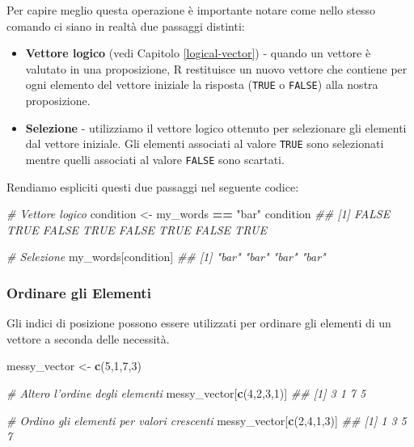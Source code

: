 \documentclass[
]{book}
\newenvironment{Shaded}{\begin{snugshade}}{\end{snugshade}}
\newcommand{\CommentTok}[1]{\textcolor[rgb]{0.56,0.35,0.01}{\textit{#1}}}
\newcommand{\DecValTok}[1]{\textcolor[rgb]{0.00,0.00,0.81}{#1}}
\newcommand{\KeywordTok}[1]{\textcolor[rgb]{0.13,0.29,0.53}{\textbf{#1}}}
\newcommand{\NormalTok}[1]{#1}
\newcommand{\OperatorTok}[1]{\textcolor[rgb]{0.81,0.36,0.00}{\textbf{#1}}}
\newcommand{\StringTok}[1]{\textcolor[rgb]{0.31,0.60,0.02}{#1}}
\providecommand{\tightlist}{%
  \setlength{\itemsep}{0pt}\setlength{\parskip}{0pt}}
\begin{document}
Per capire meglio questa operazione è importante notare come nello stesso comando ci siano in realtà due passaggi distinti:

\begin{itemize}
\tightlist
\item
  \textbf{Vettore logico} (vedi Capitolo \ref{logical-vector}) - quando un vettore è valutato in una proposizione, R restituisce un nuovo vettore che contiene per ogni elemento del vettore iniziale la risposta (\texttt{TRUE} o \texttt{FALSE}) alla nostra proposizione.
\item
  \textbf{Selezione} - utilizziamo il vettore logico ottenuto per selezionare gli elementi dal vettore iniziale. Gli elementi associati al valore \texttt{TRUE} sono selezionati mentre quelli associati al valore \texttt{FALSE} sono scartati.
\end{itemize}

Rendiamo espliciti questi due passaggi nel seguente codice:

\begin{Shaded}
\begin{Highlighting}[]
\CommentTok{# Vettore logico}
\NormalTok{condition <-}\StringTok{ }\NormalTok{my_words }\OperatorTok{==}\StringTok{ "bar"}
\NormalTok{condition}
\CommentTok{## [1] FALSE  TRUE FALSE  TRUE FALSE  TRUE FALSE  TRUE}

\CommentTok{# Selezione}
\NormalTok{my_words[condition]}
\CommentTok{## [1] "bar" "bar" "bar" "bar"}
\end{Highlighting}
\end{Shaded}

\hypertarget{ordinare-gli-elementi}{%
\subsubsection*{Ordinare gli Elementi}\label{ordinare-gli-elementi}}

Gli indici di posizione possono essere utilizzati per ordinare gli elementi di un vettore a seconda delle necessità.

\begin{Shaded}
\begin{Highlighting}[]
\NormalTok{messy_vector <-}\StringTok{ }\KeywordTok{c}\NormalTok{(}\DecValTok{5}\NormalTok{,}\DecValTok{1}\NormalTok{,}\DecValTok{7}\NormalTok{,}\DecValTok{3}\NormalTok{)}

\CommentTok{# Altero l'ordine degli elementi}
\NormalTok{messy_vector[}\KeywordTok{c}\NormalTok{(}\DecValTok{4}\NormalTok{,}\DecValTok{2}\NormalTok{,}\DecValTok{3}\NormalTok{,}\DecValTok{1}\NormalTok{)]}
\CommentTok{## [1] 3 1 7 5}

\CommentTok{# Ordino gli elementi per valori crescenti}
\NormalTok{messy_vector[}\KeywordTok{c}\NormalTok{(}\DecValTok{2}\NormalTok{,}\DecValTok{4}\NormalTok{,}\DecValTok{1}\NormalTok{,}\DecValTok{3}\NormalTok{)]}
\CommentTok{## [1] 1 3 5 7}
\end{Highlighting}
\end{Shaded}
\end{document}
